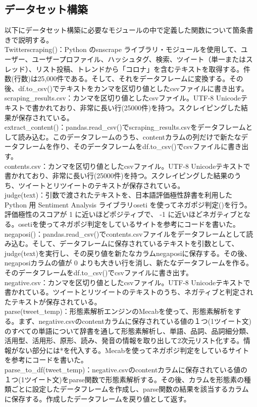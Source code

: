 \documentclass[a4paper, 11pt, titlepage]{jsarticle}
\begin{document}
\subsection{データセット構築}
以下にデータセット構築に必要なモジュールの中で定義した関数について箇条書きで説明する。\\
\noindent
Twitterscraping()：Python のsnscrape ライブラリ・モジュールを使用して、ユーザー、ユーザープロファイル、ハッシュタグ、検索、ツイート（単一またはスレッド）、リスト投稿、トレンドから「コロナ」を含むテキストを取得する。件数(行数)は25,000件である。そして、それをデータフレームに変換する\cite{snscrape1}。その後、df.to\_csv()でテキストをカンマを区切り値としたcsvファイルに書き出す\cite{snscrape2}。\\
scraping\_results.csv：カンマを区切り値としたcsvファイル。UTF-8 Unicodeテキストで書かれており、非常に長い行(25000件)を持つ。スクレイピングした結果が保存されている。\\
extract\_content()：pandas.read\_csv()でscraping\_results.csvをデータフレームとして読み込む\cite{snscrape3}。このデータフレームのうち、contentカラムの列だけで新たなデータフレームを作り、そのデータフレームをdf.to\_csv()でcsvファイルに書き出す。\\
contents.csv：カンマを区切り値としたcsvファイル。UTF-8 Unicodeテキストで書かれており、非常に長い行(25000件)を持つ。スクレイピングした結果のうち、ツイートとリツイートのテキストが保存されている。\\
judge(text)：引数で渡されたテキストを、日本語評価極性辞書を利用したPython 用 Sentiment Analysis ライブラリoseti を使ってネガポジ判定()を行う\cite{negaposi1}。評価極性のスコアが 1 に近いほどポジティブで、 -1 に近いほどネガティブとなる。osetiを使ってネガポジ判定をしているサイトを参考にコードを書いた\cite{negaposi2}。\\
negaposi()：pandas.read\_csv()でcontents.csvファイルをデータフレームとして読み込む。そして、データフレームに保存されているテキストを引数として、judge(text)を実行し、その戻り値を新たなカラムnegaposiに保存する。その後、negaposiカラムの値が 0 よりも大きい行を消し、新たなデータフレームを作る。そのデータフレームをdf.to\_csv()でcsvファイルに書き出す。\\
negative.csv：カンマを区切り値としたcsvファイル。UTF-8 Unicodeテキストで書かれている。ツイートとリツイートのテキストのうち、ネガティブと判定されたテキストが保存されている。\\
parse(tweet\_temp)：形態素解析エンジンのMecabを使って、形態素解析をする\cite{keitaiso1}。まず、negative.csvのcontentカラムに保存されている値の１つ(1ツイート文)のすべての単語について辞書を通して形態素解析し、単語、品詞、品詞細分類、活用型、活用形、原形、読み、発音の情報を取り出して2次元リスト化する。情報がない部分には*を代入する。Mecabを使ってネガポジ判定をしているサイトを参考にコードを書いた\cite{keitaiso2}。\\
parse\_to\_df(tweet\_temp)：negative.csvのcontentカラムに保存されている値の１つ(1ツイート文)をparse関数で形態素解析する。その後、カラムを形態素の種類ごとに設定したデータフレームを作成し、parse関数の結果を該当するカラムに保存する。作成したデータフレームを戻り値として返す。\\
\end{document}
